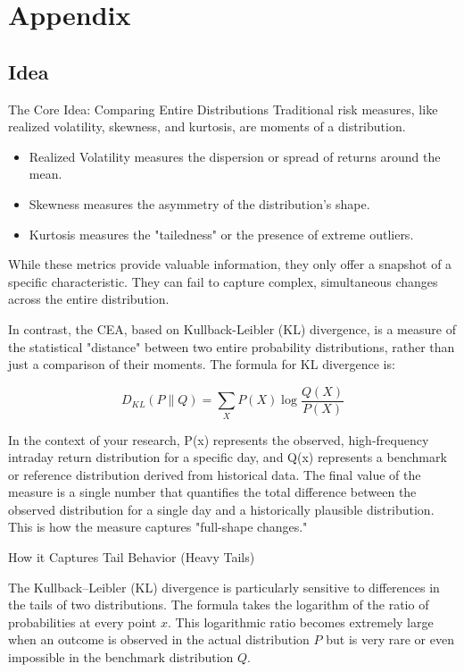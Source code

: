 \documentclass[preprint,12pt,authoryear]{elsarticle}
\begin{document}
\section*{Appendix}

\subsection*{Idea}

The Core Idea: Comparing Entire Distributions
Traditional risk measures, like realized volatility, skewness, and kurtosis, are moments of a distribution.

\begin{itemize}
    \item Realized Volatility measures the dispersion or spread of returns around the mean.
    \item Skewness measures the asymmetry of the distribution's shape.
    \item Kurtosis measures the "tailedness" or the presence of extreme outliers. 
\end{itemize}

While these metrics provide valuable information, they only offer a snapshot of a specific characteristic. They can fail to capture complex, simultaneous changes across the entire distribution.

In contrast, the CEA, based on Kullback-Leibler (KL) divergence, is a measure of the statistical "distance" between two entire probability distributions, rather than just a comparison of their moments. The formula for KL divergence is: 

\begin{equation}
    D_{KL}(P\|Q) = \sum_X P(X)\log \frac{Q(X)}{P(X)}
\end{equation}

 

In the context of your research, P(x) represents the observed, high-frequency intraday return distribution for a specific day, and Q(x) represents a benchmark or reference distribution derived from historical data. The final value of the measure is a single number that quantifies the total difference between the observed distribution for a single day and a historically plausible distribution. This is how the measure captures "full-shape changes." 

How it Captures Tail Behavior (Heavy Tails)

The Kullback–Leibler (KL) divergence is particularly sensitive to differences in the tails of two distributions. The formula takes the logarithm of the ratio of probabilities at every point $x$. This logarithmic ratio becomes extremely large when an outcome is observed in the actual distribution $P$ but is very rare or even impossible in the benchmark distribution $Q$.
\end{document}
